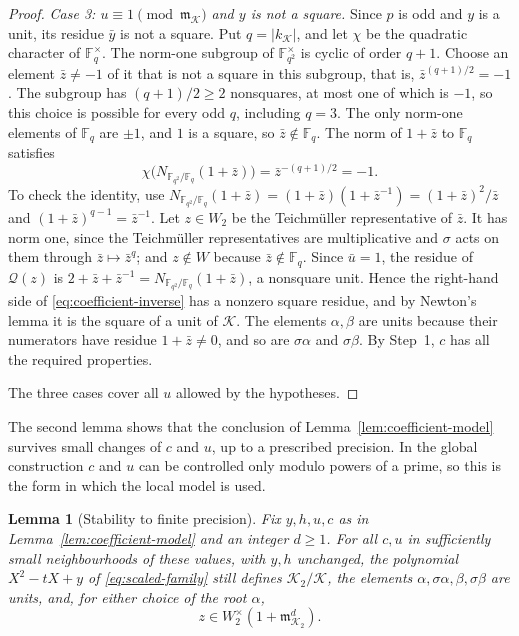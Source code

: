 \documentclass[11pt]{article}
\theoremstyle{plain}
\newtheorem{lemma}[theorem]{Lemma}
\theoremstyle{definition}
\theoremstyle{remark}
\newcommand{\F}{\mathbb F}
\begin{document}
\begin{proof}
\emph{Case 3: $u\equiv1\pmod{\mathfrak m_{\mathcal K}}$ and $y$ is not a
square.}  Since $p$ is odd and $y$ is a unit, its residue $\bar y$ is
not a square.  Put $q=|k_{\mathcal K}|$, and let $\chi$ be the quadratic
character of $\F_q^\times$.  The norm-one subgroup of $\F_{q^2}^\times$
is cyclic of order $q+1$.  Choose an element $\bar z\ne-1$ of it that is
not a square in this subgroup, that is, $\bar z^{(q+1)/2}=-1$.  The
subgroup has $(q+1)/2\ge2$ nonsquares, at most one of which is $-1$, so
this choice is possible for every odd $q$, including $q=3$.  The only norm-one elements of $\F_q$ are $\pm1$, and
$1$ is a square, so $\bar z\notin\F_q$.  The norm of $1+\bar z$ to
$\F_q$ satisfies
\[
 \chi\bigl(N_{\F_{q^2}/\F_q}(1+\bar z)\bigr)
    =\bar z^{-(q+1)/2}=-1.
\]
To check the identity, use
$N_{\F_{q^2}/\F_q}(1+\bar z)=(1+\bar z)(1+\bar z^{-1})=(1+\bar z)^2/\bar z$
and $(1+\bar z)^{q-1}=\bar z^{-1}$.  Let $z\in W_2$ be the
Teichm\"uller representative of $\bar z$.  It has norm one, since the
Teichm\"uller representatives are multiplicative and $\sigma$ acts on
them through $\bar z\mapsto\bar z^q$; and $z\notin W$ because
$\bar z\notin\F_q$.  Since $\bar u=1$, the residue of $\mathcal Q(z)$ is
$2+\bar z+\bar z^{-1}=N_{\F_{q^2}/\F_q}(1+\bar z)$, a nonsquare unit.
Hence the right-hand side of \eqref{eq:coefficient-inverse} has a
nonzero square residue, and by Newton's lemma it is the square of a unit
of $\mathcal K$.  The elements $\alpha,\beta$ are units because their
numerators have residue $1+\bar z\ne0$, and so are $\sigma\alpha$ and
$\sigma\beta$.  By Step~1, $c$ has all the required properties.

The three cases cover all $u$ allowed by the hypotheses.
\end{proof}

The second lemma shows that the conclusion of
Lemma~\ref{lem:coefficient-model} survives small changes of $c$ and $u$,
up to a prescribed precision.  In the global construction $c$ and $u$
can be controlled only modulo powers of a prime, so this is the form in
which the local model is used.

\begin{lemma}[Stability to finite precision]\label{lem:coefficient-stability}
Fix $y,h,u,c$ as in Lemma~\ref{lem:coefficient-model} and an integer
$d\ge1$.  For all $c,u$ in sufficiently small neighbourhoods of these
values, with $y,h$ unchanged, the polynomial $X^2-tX+y$ of
\eqref{eq:scaled-family} still defines $\mathcal K_2/\mathcal K$, the
elements $\alpha,\sigma\alpha,\beta,\sigma\beta$ are units, and, for
either choice of the root $\alpha$,
\[
 z\in W_2^\times(1+\mathfrak m_{\mathcal K_2}^d).
\]
\end{lemma}
\end{document}
